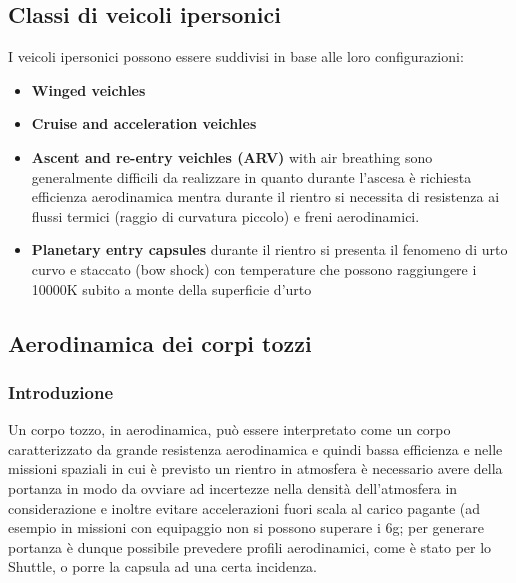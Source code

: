 \documentclass[10pt]{article}
\begin{document}
\subsection{Classi di veicoli ipersonici}
I veicoli ipersonici possono essere suddivisi in base alle loro configurazioni:
\begin{itemize}
    \item \textbf{Winged veichles}
    \item \textbf{Cruise and acceleration veichles}
    \item \textbf{Ascent and re-entry veichles (ARV)} with air breathing \textrightarrow sono generalmente difficili da realizzare in quanto durante l'ascesa è richiesta efficienza aerodinamica mentra durante il rientro si necessita di resistenza ai flussi termici (raggio di curvatura piccolo) e freni aerodinamici.
    \item \textbf{Planetary entry capsules} \textrightarrow durante il rientro si presenta il fenomeno di urto curvo e staccato (bow shock) con temperature che possono raggiungere i 10000K subito a monte della superficie d'urto
\end{itemize}

\subsection{Aerodinamica dei corpi tozzi}
\subsubsection{Introduzione}

Un corpo tozzo, in aerodinamica, può essere interpretato come un corpo caratterizzato da grande resistenza aerodinamica e quindi bassa efficienza e nelle missioni spaziali in cui è previsto un rientro in atmosfera è necessario avere della portanza in modo da ovviare ad incertezze nella densità dell'atmosfera in considerazione e inoltre evitare accelerazioni fuori scala al carico pagante (ad esempio in missioni con equipaggio non si possono superare i 6g; per generare portanza è dunque possibile prevedere profili aerodinamici, come è stato per lo Shuttle, o porre la capsula ad una certa incidenza.
\end{document}
